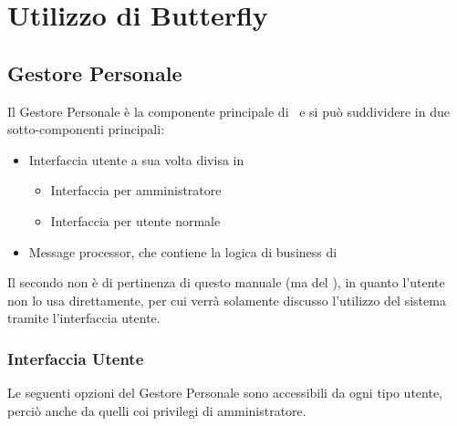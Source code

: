 \section{Utilizzo di Butterfly}\label{utilizzo}

\subsection{Gestore Personale}

Il Gestore Personale è la componente principale di \progetto\ e si può suddividere in due sotto-componenti principali:

\begin{itemize}
    \item Interfaccia utente a sua volta divisa in
    \begin{itemize}
    	\item Interfaccia per amministratore
    	\item Interfaccia per utente normale
    \end{itemize}
    \item Message processor, che contiene la logica di business di \progetto
\end{itemize}

Il secondo non è di pertinenza di questo manuale (ma del \MSd), in quanto l'utente non lo usa direttamente, per cui verrà solamente discusso l'utilizzo del sistema tramite l'interfaccia utente.

\subsubsection{Interfaccia Utente}
Le seguenti opzioni del Gestore Personale sono accessibili da ogni tipo utente, perciò anche da quelli coi privilegi di amministratore.

